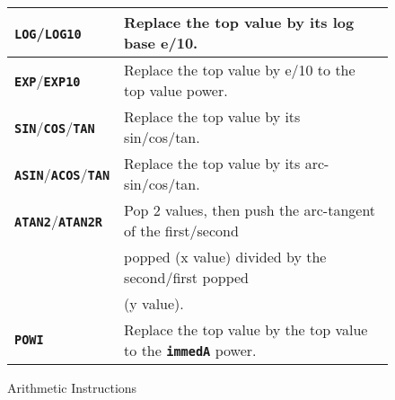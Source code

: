\documentclass[12pt]{article}
\newcommand{\TT}[1]{{\tt \bfseries #1}}
\newlength{\figurewidth}
\newenvironment{boxedfigure}[1][!btp]%
	{\begin{figure*}[#1]
	 \begin{lrbox}{\figurebox}
	 \begin{minipage}{\figurewidth}

	 \vspace*{1ex}}%
	{
	 \vspace*{1ex}

	 \end{minipage}
	 \end{lrbox}

	 \centering
	 \fbox{\hspace*{0.1in}\usebox{\figurebox}\hspace*{0.1in}}
	 \end{figure*}}
\begin{document}
\begin{boxedfigure}
\begin{center}
\begin{tabular}{|l|l|}
\\\hline
\TT{LOG}/\TT{LOG10}
    & Replace the top value by its log base e/10.
\\\hline
\TT{EXP}/\TT{EXP10}
    & Replace the top value by e/10 to the top value power.
\\\hline
\TT{SIN}/\TT{COS}/\TT{TAN}
    & Replace the top value by its sin/cos/tan.
\\\hline
\TT{ASIN}/\TT{ACOS}/\TT{TAN}
    & Replace the top value by its arc- sin/cos/tan.
\\\hline
\TT{ATAN2}/\TT{ATAN2R}
    & Pop 2 values, then push the arc-tangent of the first/second \\
    & popped (x value) divided by the second/first popped \\
    & (y value).
\\\hline
\TT{POWI}
    & Replace the top value by the top value to the \TT{immedA} power.
\\\hline
\end{tabular}
\end{center}
\caption{Arithmetic Instructions}
\label{ARITHMETIC-INSTRUCTIONS}
\end{boxedfigure}

\pagebreak
\end{document}
